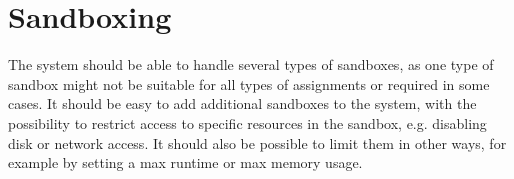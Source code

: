 \section{Sandboxing}
The system should be able to handle several types of sandboxes, as one type of sandbox
might not be suitable for all types of assignments or required in some cases. It should
be easy to add additional sandboxes to the system, with the possibility to restrict access to
specific resources in the sandbox, e.g. disabling disk or network access. It should also be
possible to limit them in other ways, for example by setting a max runtime or max memory usage.
